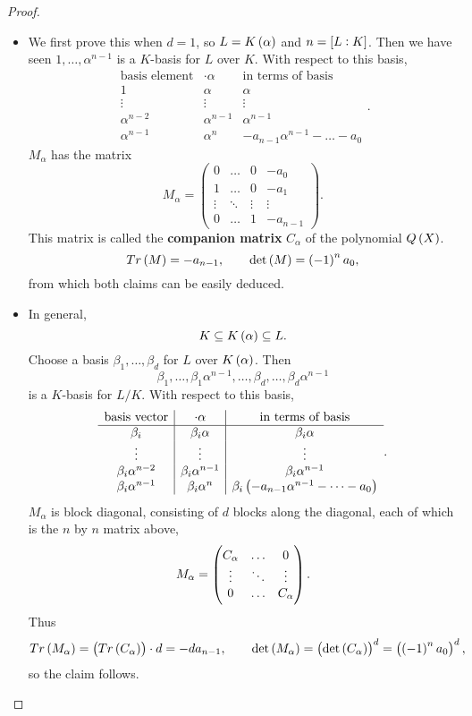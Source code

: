 \begin{proof}
\hfill
\begin{itemize}
\item We first prove this when $ d = 1 $, so $ L = K\br{\alpha} $ and $ n = \sbr{L : K} $. Then we have seen $ 1, \dots, \alpha^{n - 1} $ is a $ K $-basis for $ L $ over $ K $. With respect to this basis,
$$
\begin{array}{c|c|c}
\text{basis element} & \cdot \alpha & \text{in terms of basis} \\
\hline
1 & \alpha & \alpha \\
\vdots & \vdots & \vdots \\
\alpha^{n - 2} & \alpha^{n - 1} & \alpha^{n - 1} \\
\alpha^{n - 1} & \alpha^n & -a_{n - 1}\alpha^{n - 1} - \dots - a_0
\end{array}.
$$
$ M_\alpha $ has the matrix
$$ M_\alpha =
\begin{pmatrix}
0 & \dots & 0 & -a_0 \\
1 & \dots & 0 & -a_1 \\
\vdots & \ddots & \vdots & \vdots \\
0 & \dots & 1 & -a_{n - 1}
\end{pmatrix}.
$$
This matrix is called the \textbf{companion matrix} $ C_\alpha $ of the polynomial $ Q\br{X} $.
$$ Tr\br{M} = -a_{n - 1}, \qquad \det\br{M} = \br{-1}^na_0, $$
from which both claims can be easily deduced.
\item In general,
$$ K \subseteq K\br{\alpha} \subseteq L. $$
Choose a basis $ \beta_1, \dots, \beta_d $ for $ L $ over $ K\br{\alpha} $. Then
$$ \beta_1, \dots, \beta_1\alpha^{n - 1}, \dots, \beta_d, \dots, \beta_d\alpha^{n - 1} $$
is a $ K $-basis for $ L / K $. With respect to this basis,
$$
\begin{array}{c|c|c}
\text{basis vector} & \cdot \alpha & \text{in terms of basis} \\
\hline
\beta_i & \beta_i\alpha & \beta_i\alpha \\
\vdots & \vdots & \vdots \\
\beta_i\alpha^{n - 2} & \beta_i\alpha^{n - 1} & \beta_i\alpha^{n - 1} \\
\beta_i\alpha^{n - 1} & \beta_i\alpha^n & \beta_i\br{-a_{n - 1}\alpha^{n - 1} - \dots - a_0} \\
\end{array}.
$$
$ M_\alpha $ is block diagonal, consisting of $ d $ blocks along the diagonal, each of which is the $ n $ by $ n $ matrix above,
$$ M_\alpha = \threebythree{C_\alpha}{\dots}{0}{\vdots}{\ddots}{\vdots}{0}{\dots}{C_\alpha}. $$
Thus
$$ Tr\br{M_\alpha} = \br{Tr\br{C_\alpha}} \cdot d = -da_{n - 1}, \qquad \det\br{M_\alpha} = \br{\det\br{C_\alpha}}^d = \br{\br{-1}^na_0}^d, $$
so the claim follows.
\end{itemize}
\end{proof}


